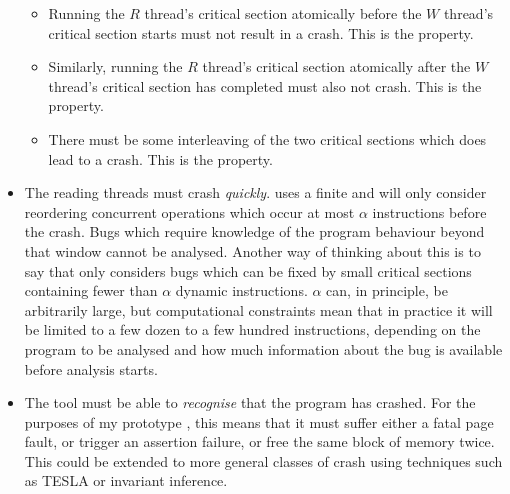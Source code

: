 \begin{itemize}
  \begin{itemize}
  \item Running the $R$ thread's critical section atomically before
    the $W$ thread's critical section starts must not result in a
    crash.  This is the  property.
  \item Similarly, running the $R$ thread's critical section
    atomically after the $W$ thread's critical section has completed
    must also not crash.  This is the 
    property.
  \item There must be some interleaving of the two critical sections
    which does lead to a crash.  This is the  property.
  \end{itemize}
\item The reading threads must crash \emph{quickly}.  {\Technique}
  uses a finite  \introduction{$\alpha$}
  and will only consider reordering concurrent operations which occur
  at most $\alpha$ instructions before the crash.  Bugs which require
  knowledge of the program behaviour beyond that window cannot be
  analysed.  Another way of thinking about this is to say that
  {\technique} only considers bugs which can be fixed by small
  critical sections containing fewer than $\alpha$ dynamic
  instructions.  $\alpha$ can, in principle, be arbitrarily large, but
  computational constraints mean that in practice it will be limited
  to a few dozen to a few hundred instructions, depending on the
  program to be analysed and how much information about the bug is
  available before analysis starts.
\item The tool must be able to \emph{recognise}
  that the program has crashed.  For the purposes of my prototype
  {\implementation}, this means that it must suffer either a fatal
  page fault, or trigger an assertion failure, or free the same block
  of memory twice.  This could be extended to more general classes of
  crash using techniques such as TESLA\needCite{} or invariant
  inference\needCite{}.


\end{itemize}

